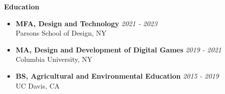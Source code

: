 \documentclass[lettersized,9pt]{article}
\newcommand{\header}[1]{\textbf{\normalsize #1}\vspace{-2pt}}
\begin{document}
\header{Education}

\begin{itemize}
  \item \textbf{MFA, Design and Technology} \dotfill \textit{2021 - 2023} \\
  Parsons School of Design, NY
  \item \textbf{MA, Design and Development of Digital Games} \dotfill \textit{2019 - 2021} \\
  Columbia University, NY
  \item \textbf{BS, Agricultural and Environmental Education} \dotfill \textit{2015 - 2019} \\
  UC Davis, CA
\end{itemize}
\end{document}
